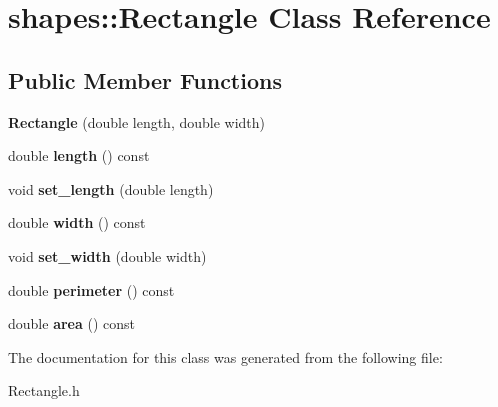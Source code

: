 \hypertarget{classshapes_1_1Rectangle}{}\section{shapes\+::Rectangle Class Reference}
\label{classshapes_1_1Rectangle}
\subsection*{Public Member Functions}
\begin{DoxyCompactItemize}
\item 
\mbox{\label{classshapes_1_1Rectangle_abad17af781d762339953995350cdcddd}} 
{\bfseries Rectangle} (double length, double width)
\item 
\mbox{\label{classshapes_1_1Rectangle_aabf76bf7c0571e387bb91b0f41fc761f}} 
double {\bfseries length} () const
\item 
\mbox{\label{classshapes_1_1Rectangle_aa630e9832334840b11bfabbcb35f1c5e}} 
void {\bfseries set\+\_\+length} (double length)
\item 
\mbox{\label{classshapes_1_1Rectangle_a03e57296ddbc69aef59652fab2ffe0d7}} 
double {\bfseries width} () const
\item 
\mbox{\label{classshapes_1_1Rectangle_a79eb7f7a2d863b5d589b460581ca6500}} 
void {\bfseries set\+\_\+width} (double width)
\item 
\mbox{\label{classshapes_1_1Rectangle_a43a73265e0cfbfe6be3f872884319db8}} 
double {\bfseries perimeter} () const
\item 
\mbox{\label{classshapes_1_1Rectangle_a94479749febd391d6becfd9691241dd3}} 
double {\bfseries area} () const
\end{DoxyCompactItemize}


The documentation for this class was generated from the following file\+:\begin{DoxyCompactItemize}
\item 
Rectangle.\+h\end{DoxyCompactItemize}
